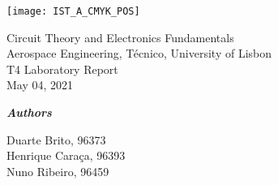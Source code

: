 
\thispagestyle {empty}

\texttt{[image: IST\_A\_CMYK\_POS]}

\begin{center}
%

\vspace{1.0cm}


\vspace{1cm}
{\FontLb Circuit Theory and Electronics Fundamentals} \\ %
\vspace{1cm}
{\FontSn Aerospace Engineering, Técnico, University of Lisbon} \\ %
\vspace{1cm}
{\FontSn T4 Laboratory Report} \\
\vspace{1cm}
{\FontSn May 04, 2021} \\ %
\vspace{1cm}

\textbf{\emph{Authors}\\[0.06in]}

Duarte Brito, 96373\\
Henrique Caraça, 96393\\
Nuno Ribeiro, 96459\\

\vspace{2cm}
\end{center}
